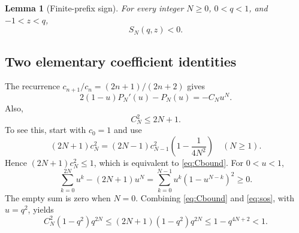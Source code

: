 \documentclass[11pt]{article}
\newtheorem{lemma}[theorem]{Lemma}
\theoremstyle{remark}
\begin{document}
\begin{lemma}[Finite-prefix sign]\label{lem:prefix}
For every integer $N\ge0$, $0<q<1$, and $-1<z<q$,
\[
 S_N(q,z)<0.
\]
\end{lemma}

\subsection{Two elementary coefficient identities}
The recurrence $c_{n+1}/c_n=(2n+1)/(2n+2)$ gives
\begin{equation}\label{eq:poly}
 2(1-u)P_N'(u)-P_N(u)=-C_Nu^N.
\end{equation}
Also,
\begin{equation}\label{eq:Cbound}
 C_N^2\le 2N+1.
\end{equation}
To see this, start with $c_0=1$ and use
\[
 (2N+1)c_N^2=(2N-1)c_{N-1}^2\left(1-\frac1{4N^2}\right)
 \quad(N\ge1).
\]
Hence $(2N+1)c_N^2\le1$, which is equivalent to \eqref{eq:Cbound}.
For $0<u<1$,
\begin{equation}\label{eq:sos}
 \sum_{k=0}^{2N}u^k-(2N+1)u^N
 =\sum_{k=0}^{N-1}u^k(1-u^{N-k})^2\ge0.
\end{equation}
The empty sum is zero when $N=0$.
Combining \eqref{eq:Cbound} and \eqref{eq:sos}, with $u=q^2$, yields
\begin{equation}\label{eq:boundarybound}
 C_N^2(1-q^2)q^{2N}
 \le (2N+1)(1-q^2)q^{2N}
 \le1-q^{4N+2}<1.
\end{equation}
\end{document}
